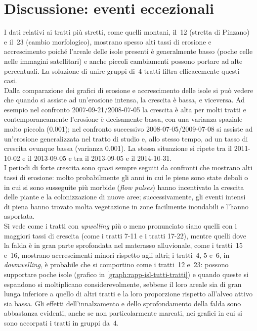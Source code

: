 \section{Discussione: eventi eccezionali}
I dati relativi ai tratti più stretti, come quelli montani, il~12 (stretta di Pinzano) e il~23 (cambio morfologico), mostrano spesso alti tassi di erosione e accrescimento poiché l'areale delle isole presenti è generalmente basso (poche celle nelle immagini satellitari) e anche piccoli cambiamenti possono portare ad alte percentuali.
La soluzione di unire gruppi di~4 tratti filtra efficacemente questi casi.
\\
Dalla comparazione dei grafici di erosione e accrescimento delle isole si può vedere che quando si assiste ad un'erosione intensa, la crescita è bassa, e viceversa.
Ad esempio nel confronto 2007-09-21/2008-07-05 la crescita è alta per molti tratti e contemporaneamente l'erosione è decisamente bassa, con una varianza spaziale molto piccola (\num{0.001}); nel confronto successivo 2008-07-05/2009-07-08 si assiste ad un'erosione generalizzata nel tratto di studio e, allo stesso tempo, ad un tasso di crescita ovunque bassa (varianza \num{0.001}).
La stessa situazione si ripete tra il 2011-10-02 e il 2013-09-05 e tra il 2013-09-05 e il 2014-10-31.
\\
I periodi di forte crescita sono quasi sempre seguiti da confronti che mostrano alti tassi di erosione: molto probabilmente gli anni in cui le piene sono state deboli o in cui si sono susseguite più morbide (\emph{flow pulses}) hanno incentivato la crescita delle piante e la colonizzazione di nuove aree; successivamente, gli eventi intensi di piena hanno trovato molta vegetazione in zone facilmente inondabili e l'hanno asportata.
\\
Si vede come i tratti con \emph{upwelling} più o meno pronunciato siano quelli con i maggiori tassi di crescita (come i tratti 7-11 e i tratti 17-22), mentre quelli dove la falda è in gran parte sprofondata nel materasso alluvionale, come i tratti~15 e~16, mostrano accrescimenti minori rispetto agli altri;
i tratti~4, 5 e~6, in \emph{downwelling}, è probabile che si comportino come i tratti~12 e~23: possono supportare poche isole (grafico in \cref{graph:rapp-isl-tutti-tratti}) e quando queste si espandono si moltiplicano considerevolmente, sebbene il loro areale sia di gran lunga inferiore a quello di altri tratti e la loro proporzione rispetto all'alveo attivo sia bassa.
Gli effetti dell'innalzamento e dello sprofondamento della falda sono abbastanza evidenti, anche se non particolarmente marcati, nei grafici in cui si sono accorpati i tratti in gruppi da~4.
